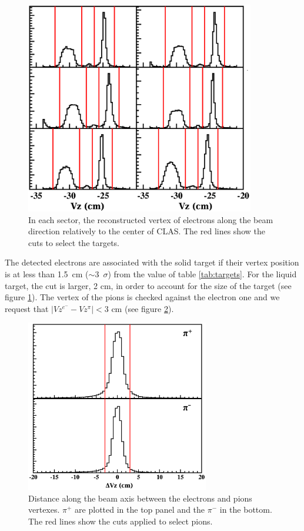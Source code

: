 \begin{figure}[p]
\centering
\includegraphics[width=10cm] {chap5-fig/Vertex_el_data.png}
\caption {In each sector, the reconstructed vertex of electrons along the beam
direction relatively to the center of CLAS. The red lines show the cuts 
to select the targets.}
\label{vertex}
\end{figure}

The detected electrons are associated with the solid target if their vertex 
position is at less than 1.5~cm ($\sim$3~$\sigma$) from the value of table 
\ref{tab:targets}. For the liquid target, the cut is larger, 2 cm, in order to 
account for the size of the target (see figure \ref{vertex}). The vertex of 
the pions is checked against the electron one and we request that 
$| Vz^{e^-} - Vz^{\pi} | < 3$ cm (see figure \ref{fig:dvzpi}).

\begin{figure}[tbp]
\centering
\includegraphics[width=8cm] {chap5-fig/Vertex_pi_data.png}
\caption {Distance along the beam axis between the electrons and pions 
vertexes. $\pi^+$ are plotted in the top panel and the $\pi^-$ in the bottom.
The red lines show the cuts applied to select pions.}
\label{fig:dvzpi}
\end{figure}

